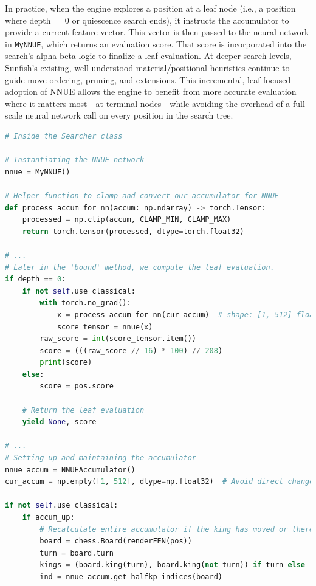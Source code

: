 \documentclass[12pt,a4paper]{article}
\begin{document}
In practice, when the engine explores a position at a leaf node (i.e., a position where depth $= 0$ or quiescence search ends), it instructs the accumulator to provide a current feature vector. This vector is then passed to the neural network in \texttt{MyNNUE}, which returns an evaluation score. That score is incorporated into the search’s alpha-beta logic to finalize a leaf evaluation. At deeper search levels, Sunfish’s existing, well-understood material/positional heuristics continue to guide move ordering, pruning, and extensions. This incremental, leaf-focused adoption of NNUE allows the engine to benefit from more accurate evaluation where it matters most—at terminal nodes—while avoiding the overhead of a full-scale neural network call on every position in the search tree.
\begin{lstlisting}[language=Python, caption={Refined Sunfish Searcher Code snippet with NNUE Integration}, label={lst:searcher_nnue}, basicstyle=\footnotesize\ttfamily, breaklines=true]
# Inside the Searcher class

# Instantiating the NNUE network
nnue = MyNNUE()

# Helper function to clamp and convert our accumulator for NNUE
def process_accum_for_nn(accum: np.ndarray) -> torch.Tensor:
    processed = np.clip(accum, CLAMP_MIN, CLAMP_MAX)
    return torch.tensor(processed, dtype=torch.float32)

# ...
# Later in the 'bound' method, we compute the leaf evaluation.
if depth == 0:
    if not self.use_classical:
        with torch.no_grad():
            x = process_accum_for_nn(cur_accum)  # shape: [1, 512] float32
            score_tensor = nnue(x)
        raw_score = int(score_tensor.item())
        score = (((raw_score // 16) * 100) // 208)
        print(score)
    else:
        score = pos.score

    # Return the leaf evaluation
    yield None, score

# ...
# Setting up and maintaining the accumulator
nnue_accum = NNUEAccumulator()
cur_accum = np.empty([1, 512], dtype=np.float32)  # Avoid direct changes to root

if not self.use_classical:
    if accum_up:
        # Recalculate entire accumulator if the king has moved or there's a special update needed.
        board = chess.Board(renderFEN(pos))
        turn = board.turn
        kings = (board.king(turn), board.king(not turn)) if turn else (board.king(not turn), board.king(turn))
        ind = nnue_accum.get_halfkp_indices(board)


\end{lstlisting}
\end{document}
